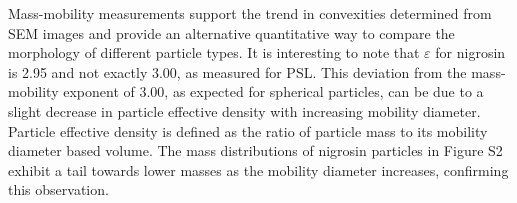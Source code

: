 Mass-mobility measurements support the trend in convexities determined from SEM images and provide an alternative quantitative way to compare the morphology of different particle types. It is interesting to note that $\varepsilon$ for nigrosin is 2.95 and not exactly 3.00, as measured for PSL. This deviation from the mass-mobility exponent of 3.00, as expected for spherical particles, can be due to a slight decrease in particle effective density with increasing mobility diameter. Particle effective density is defined as the ratio of particle mass to its mobility diameter based volume. The mass distributions of nigrosin particles in Figure S2 exhibit a tail towards lower masses as the mobility diameter increases, confirming this observation.
